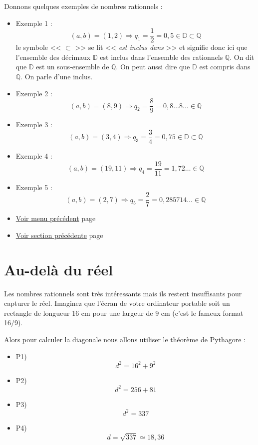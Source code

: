 \documentclass[a4paper,11pt]{book}
\begin{document}
Donnons quelques exemples de nombres rationnels :


\begin{itemize}
\item Exemple 1 : \[(a, b) = (1, 2)\Rightarrow q_1 = \dfrac{1}{2} =
  0,5\in\mathbb{D}\subset\mathbb{Q}\] le symbole <<  \(\subset\)  >> se
lit <<  \emph{est inclus dans}  >> et signifie donc ici que l'ensemble des
décimaux \(\mathbb{D}\) est inclus dans
l'ensemble des rationnels \(\mathbb{Q}\). On dit que \(\mathbb{D}\)
est un sous-ensemble de \(\mathbb{Q}\). On peut aussi dire que
\(\mathbb{D}\) est compris dans \(\mathbb{Q}\). On parle d'une
\gls{inclus}.
\item Exemple 2 : \[(a, b) = (8, 9)\Rightarrow q_2 = \dfrac{8}{9} = 0,8\dots 8\dots\in\mathbb{Q}\]
\item Exemple 3 : \[(a, b) = (3, 4)\Rightarrow q_3 = \dfrac{3}{4} = 0,75\in\mathbb{D}\subset\mathbb{Q}\]
\item Exemple 4 : \[(a, b) = (19, 11)\Rightarrow q_4 = \dfrac{19}{11} = 1,72\dots \in\mathbb{Q}\]
\item Exemple 5 : \[(a, b) = (2, 7)\Rightarrow q_5 = \dfrac{2}{7} = 0,285714\dots \in\mathbb{Q}\]
\end{itemize}


\begin{itemize}
\item \hyperref[orga5086f2]{Voir menu précédent}
page~\pageref{page:content1-menu}
\item \hyperref[org1213e07]{Voir section précédente}
page~\pageref{page:sec2.1.3cpu}
\end{itemize}

\clearpage

\section{Au-delà du réel}
\label{sec:org223f015}
\label{orgff5d9b3}
\label{page:sec2.1.5real}

Les nombres rationnels sont très
intéressants mais ils restent insuffisants pour capturer le
réel. Imaginez que l'écran de votre ordinateur portable soit un
rectangle de longueur 16 cm pour une largeur de 9 cm (c'est le fameux
format 16/9).

Alors pour calculer la diagonale nous allons utiliser le théorème de
Pythagore :


\begin{itemize}
\item P1) \[d^2 = 16^2 + 9^2\]
\item P2) \[d^2 = 256 + 81\]
\item P3) \[d^2 = 337\]
\item P4) \[d = \sqrt{337} \simeq 18,36\]
\end{itemize}
\end{document}
